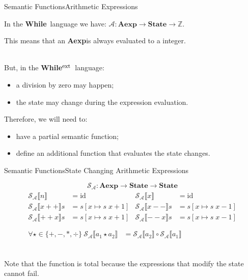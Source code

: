 \documentclass{beamer}
\newcommand{\While}{\textbf{While}}
\newcommand{\ExtWhile}{\textbf{While}\ensuremath{^{\mbox{\footnotesize ext}}}}
\newcommand{\Aexp}{\textbf{Aexp}}
\newcommand{\State}{\textbf{State}}
\newcommand{\Z}{\mathbb{Z}}
\newcommand{\sem}[2]{\mathcal{#1} \llbracket #2 \rrbracket}
\begin{document}
\begin{frame}{Semantic Functions}{Arithmetic Expressions}

    In the \While\ language we have: $\mathcal{A}: \Aexp \to \State \to \Z$.

    This means that an \Aexp is always evaluated to a integer.

    ~\\
    But, in the \ExtWhile\ language:
    \begin{itemize}
        \item<2-> a division by zero may happen;
        \item<3-> the state may change during the expression evaluation.
    \end{itemize}
    Therefore, we will need to:
    \begin{itemize}
        \item<2-> have a partial semantic function;
        \item<3-> define an additional function that evaluates the state changes.
    \end{itemize}

\end{frame}

\begin{frame}{Semantic Functions}{State Changing Arithmetic Expressions}

    $$\mathcal{S_A} : \Aexp \to \State \to \State$$
    \begin{gather*}
        \begin{aligned}
            \sem{S_A}{n}      & = \mathrm{id}         &
            \sem{S_A}{x}      & = \mathrm{id}           \\
            \sem{S_A}{x+\!+}s & = s[x \mapsto s\;x+1] &
            \sem{S_A}{x-\!-}s & = s[x \mapsto s\;x-1]   \\
            \sem{S_A}{+\!+x}s & = s[x \mapsto s\;x+1] &
            \sem{S_A}{-\!-x}s & = s[x \mapsto s\;x-1]   \\
        \end{aligned} \\
        \begin{aligned}
            \forall \star \in \{+, -, *, \div\}\
            \sem{S_A}{a_1 \star a_2} & = \sem{S_A}{a_2} \circ \sem{S_A}{a_1}
        \end{aligned}
    \end{gather*}

    ~\\
    Note that the function is total because the expressions that modify the state cannot fail.

\end{frame}
\end{document}
